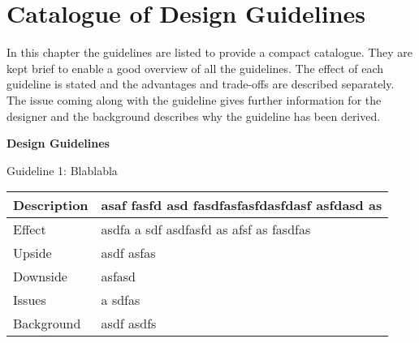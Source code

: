 \chapter{Catalogue of Design Guidelines}

In this chapter the guidelines are listed to provide a compact catalogue. They are kept brief to enable a good overview of all the guidelines. The effect of each guideline is stated and the advantages and trade-offs are described separately. The issue coming along with the guideline gives further information for the designer and the background describes why the guideline has been derived.

\textbf{Design Guidelines}

Guideline 1: Blablabla

\begin{tabular}{|ll|}

	\hline 
	Description & asaf fasfd asd fasdfasfasfdasfdasf asfdasd as \\ 
	\hline 
	Effect &  asdfa a sdf asdfasfd as afsf as fasdfas\\ 
	\hline 
	Upside &   asdf asfas\\ 
	\hline 
	Downside &  asfasd  \\ 
	\hline 
	Issues &  a sdfas \\ 
	\hline 
	Background & asdf asdfs \\ 
	\hline 
\end{tabular} 